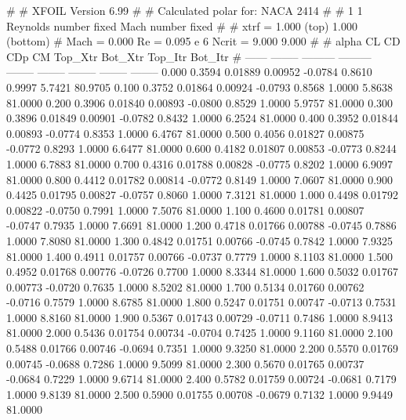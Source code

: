 #  
#       XFOIL         Version 6.99
#  
# Calculated polar for: NACA 2414                                       
#  
# 1 1 Reynolds number fixed          Mach number fixed         
#  
# xtrf =   1.000 (top)        1.000 (bottom)  
# Mach =   0.000     Re =     0.095 e 6     Ncrit =   9.000  9.000
#  
#   alpha    CL        CD       CDp       CM     Top_Xtr  Bot_Xtr  Top_Itr  Bot_Itr
#  ------ -------- --------- --------- -------- -------- -------- -------- --------
   0.000   0.3594   0.01889   0.00952  -0.0784   0.8610   0.9997   5.7421  80.9705
   0.100   0.3752   0.01864   0.00924  -0.0793   0.8568   1.0000   5.8638  81.0000
   0.200   0.3906   0.01840   0.00893  -0.0800   0.8529   1.0000   5.9757  81.0000
   0.300   0.3896   0.01849   0.00901  -0.0782   0.8432   1.0000   6.2524  81.0000
   0.400   0.3952   0.01844   0.00893  -0.0774   0.8353   1.0000   6.4767  81.0000
   0.500   0.4056   0.01827   0.00875  -0.0772   0.8293   1.0000   6.6477  81.0000
   0.600   0.4182   0.01807   0.00853  -0.0773   0.8244   1.0000   6.7883  81.0000
   0.700   0.4316   0.01788   0.00828  -0.0775   0.8202   1.0000   6.9097  81.0000
   0.800   0.4412   0.01782   0.00814  -0.0772   0.8149   1.0000   7.0607  81.0000
   0.900   0.4425   0.01795   0.00827  -0.0757   0.8060   1.0000   7.3121  81.0000
   1.000   0.4498   0.01792   0.00822  -0.0750   0.7991   1.0000   7.5076  81.0000
   1.100   0.4600   0.01781   0.00807  -0.0747   0.7935   1.0000   7.6691  81.0000
   1.200   0.4718   0.01766   0.00788  -0.0745   0.7886   1.0000   7.8080  81.0000
   1.300   0.4842   0.01751   0.00766  -0.0745   0.7842   1.0000   7.9325  81.0000
   1.400   0.4911   0.01757   0.00766  -0.0737   0.7779   1.0000   8.1103  81.0000
   1.500   0.4952   0.01768   0.00776  -0.0726   0.7700   1.0000   8.3344  81.0000
   1.600   0.5032   0.01767   0.00773  -0.0720   0.7635   1.0000   8.5202  81.0000
   1.700   0.5134   0.01760   0.00762  -0.0716   0.7579   1.0000   8.6785  81.0000
   1.800   0.5247   0.01751   0.00747  -0.0713   0.7531   1.0000   8.8160  81.0000
   1.900   0.5367   0.01743   0.00729  -0.0711   0.7486   1.0000   8.9413  81.0000
   2.000   0.5436   0.01754   0.00734  -0.0704   0.7425   1.0000   9.1160  81.0000
   2.100   0.5488   0.01766   0.00746  -0.0694   0.7351   1.0000   9.3250  81.0000
   2.200   0.5570   0.01769   0.00745  -0.0688   0.7286   1.0000   9.5099  81.0000
   2.300   0.5670   0.01765   0.00737  -0.0684   0.7229   1.0000   9.6714  81.0000
   2.400   0.5782   0.01759   0.00724  -0.0681   0.7179   1.0000   9.8139  81.0000
   2.500   0.5900   0.01755   0.00708  -0.0679   0.7132   1.0000   9.9449  81.0000
